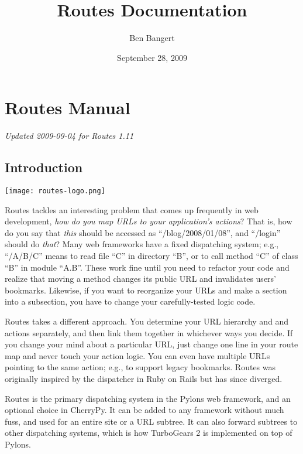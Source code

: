 \documentclass[letterpaper,10pt,english]{manual}
\title{Routes Documentation}
\date{September 28, 2009}
\author{Ben Bangert}
\begin{document}
\maketitle
\tableofcontents



\resetcurrentobjects
\hypertarget{--doc-manual}{}

\chapter{Routes Manual}

\emph{Updated 2009-09-04 for Routes 1.11}


\section{Introduction}

{\texttt{[image: routes-logo.png]}\hfill}

Routes tackles an interesting problem that comes up frequently in web
development, \emph{how do you map URLs to your application's actions}? That is, how
do you say that \emph{this} should be accessed as ``/blog/2008/01/08'', and ``/login''
should do \emph{that}? Many web frameworks have a fixed dispatching system; e.g.,
``/A/B/C'' means to read file ``C'' in directory ``B'', or to call method ``C'' of
class ``B'' in module ``A.B''. These work fine until you need to refactor your code
and realize that moving a method changes its public URL and invalidates users'
bookmarks.  Likewise, if you want to reorganize your URLs and make a section
into a subsection, you have to change your carefully-tested logic code.

Routes takes a different approach. You determine your URL hierarchy and and
actions separately, and then link them together in whichever ways you decide.
If you change your mind about a particular URL, just change one line in your
route map and never touch your action logic. You can even have multiple URLs
pointing to the same action; e.g., to support legacy bookmarks.  Routes was
originally inspired by the dispatcher in Ruby on Rails but has since diverged.

Routes is the primary dispatching system in the Pylons web framework, and an
optional choice in CherryPy. It can be added to any
framework without much fuss, and used for an entire site or a URL subtree.
It can also forward subtrees to other dispatching systems, which is how
TurboGears 2 is implemented on top of Pylons.
\end{document}

